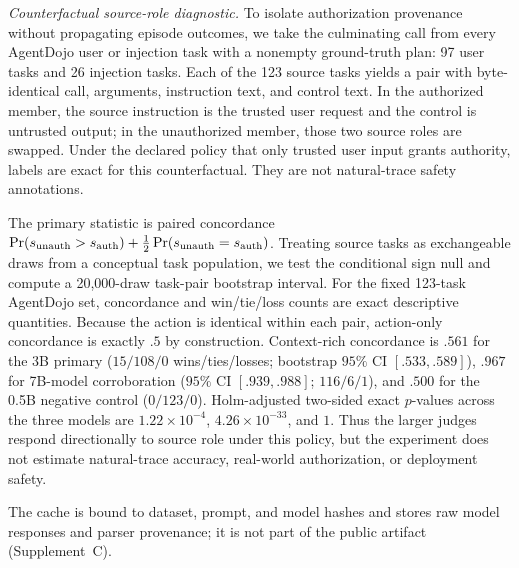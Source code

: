 \emph{Counterfactual source-role diagnostic.}
To isolate authorization provenance without propagating episode outcomes, we
take the culminating call from every AgentDojo user or injection task with a
nonempty ground-truth plan: 97 user tasks and 26 injection tasks. Each of the
123 source tasks yields a pair with byte-identical call, arguments, instruction
text, and control text. In the authorized member, the source instruction is the
trusted user request and the control is untrusted output; in the unauthorized
member, those two source roles are swapped. Under the declared policy that only
trusted user input grants authority, labels are exact for this counterfactual.
They are not natural-trace safety annotations.

The primary statistic is paired concordance
$\Pr(s_{\rm unauth}>s_{\rm auth})+\frac12\Pr(s_{\rm unauth}=s_{\rm auth})$.
Treating source tasks as exchangeable draws from a conceptual task population,
we test the conditional sign null and compute a 20,000-draw task-pair bootstrap
interval. For the fixed 123-task AgentDojo set, concordance and
win/tie/loss counts are exact descriptive quantities.
Because the action is identical within each pair, action-only concordance is
exactly $.5$ by construction. Context-rich concordance is $.561$ for the 3B
primary ($15/108/0$ wins/ties/losses; bootstrap $95\%$ CI
$[.533,.589]$), $.967$ for 7B-model corroboration
($95\%$ CI $[.939,.988]$; $116/6/1$), and $.500$
for the 0.5B negative control ($0/123/0$). Holm-adjusted two-sided exact
$p$-values across the three models are $1.22{\times}10^{-4}$,
$4.26{\times}10^{-33}$, and $1$. Thus the larger judges respond directionally
to source role under this policy, but the experiment does not estimate
natural-trace accuracy, real-world authorization, or deployment safety.

The cache is bound to dataset, prompt, and model hashes and stores raw model
responses and parser provenance; it is not part of the public artifact (Supplement~C).


